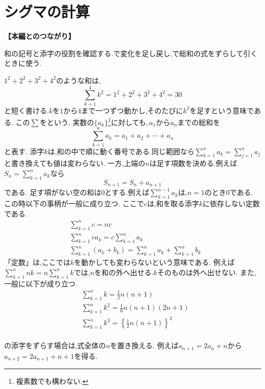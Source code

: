 
\section{シグマの計算}\label{節：シグマの計算}
  \noindent\textbf{【本編とのつながり】}\par
  和の記号と添字の役割を確認する.で変化を足し戻し,で総和の式をずらして引くときに使う.

  $1^2+2^2+3^2+4^2$のような和は,
  \[
    \sum_{k=1}^{4}k^2=1^2+2^2+3^2+4^2=30
  \]
  と短く書ける.$k$を$1$から$4$まで一つずつ動かし,そのたびに$k^2$を足すという意味である.
  この$\sum$をという.
  実数の$\{a_k\}$\footnote{複素数でも構わない.}に対しても,\,$a_1$から$a_n$までの総和を
  \[
    \sum_{k=1}^{n} a_k=a_1+a_2+\cdots+ a_n
  \]
  と表す.
  添字$k$は,和の中で順に動く番号である.同じ範囲なら$\sum_{k=1}^{n}a_k=\sum_{j=1}^{n}a_j$と書き換えても値は変わらない.
  一方,上端の$n$は足す項数を決める.例えば$S_n=\sum_{k=1}^{n}a_k$なら
  \[
    S_{n+1}=S_n+a_{n+1}
  \]
  である.
  足す項がない空の和は$0$とする.例えば$\sum_{k=1}^{n-1}a_k$は,$n=1$のとき$0$である.
  この時以下の事柄が一般に成り立つ.
  ここで$c$は,和を取る添字$k$に依存しない定数である.
  \begin{align*}
    &\sum_{k=1}^{n} c=nc\\
    &\sum_{k=1}^{n} ca_k=c\sum_{k=1}^{n} a_k\\
    &\sum_{k=1}^{n} (a_k+b_k)=\sum_{k=1}^{n} a_k+\sum_{k=1}^{n} b_k
  \end{align*}
  「定数」は,ここでは$k$を動かしても変わらないという意味である.
  例えば$\sum_{k=1}^{n}nk=n\sum_{k=1}^{n}k$では,$n$を和の外へ出せる.$k$そのものは外へ出せない.
  また,一般に以下が成り立つ.
  \begin{align*}
    &\sum_{k=1}^{n} k=\frac{1}{2}n(n+1)\\
    &\sum_{k=1}^{n} k^2=\frac{1}{6}n(n+1)(2n+1)\\
    &\sum_{k=1}^{n} k^3=\left\{\frac{1}{2}n(n+1)\right\}^2\\
  \end{align*}

  の添字をずらす場合は,式全体の$n$を置き換える.
  例えば$a_{n+1}=2a_n+n$から$a_{n+2}=2a_{n+1}+n+1$を得る.
